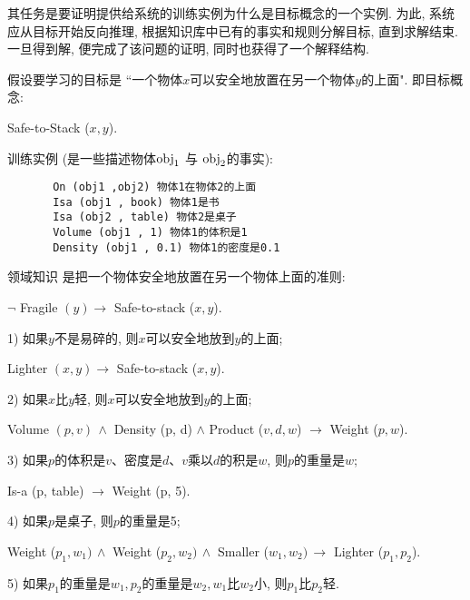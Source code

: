 其任务是要证明提供给系统的训练实例为什么是目标概念的一个实例.
为此, 系统应从目标开始反向推理, 根据知识库中已有的事实和规则分解目标, 直到求解结束.
一旦得到解, 便完成了该问题的证明, 同时也获得了一个解释结构.

\begin{example}\label{AIC7exam7.14}
    假设要学习的目标是 ``一个物体$x$可以安全地放置在另一个物体$y$的上面". 即目标概念:
\begin{center}
    Safe-to-Stack ($x, y$).
\end{center}

训练实例 (是一些描述物体$\textup{obj}_1$ 与 $\textup{obj}_2$的事实):
\begin{Verbatim}
       On (obj1 ,obj2) 物体1在物体2的上面
       Isa (obj1 , book) 物体1是书
       Isa (obj2 , table) 物体2是桌子
       Volume (obj1 , 1) 物体1的体积是1
       Density (obj1 , 0.1) 物体1的密度是0.1
\end{Verbatim}
\vspace{-0.4cm}
\end{example}

领域知识   是把一个物体安全地放置在另一个物体上面的准则:
\begin{center}
    $\neg $ Fragile $(y) \rightarrow$ Safe-to-stack ($x, y$).
\end{center}
1) 如果$y$不是易碎的, 则$x$可以安全地放到$y$的上面;
\begin{center}
    Lighter $(x, y) \rightarrow$ Safe-to-stack ($x, y$).
\end{center}

2) 如果$x$比$y$轻, 则$x$可以安全地放到$y$的上面;
\begin{center}
    Volume $(p, v)\, \wedge$ Density (p, d) $\wedge$ Product ($v, d, w$) $\rightarrow$ Weight ($p, w$).
\end{center}

3) 如果$p$的体积是$v$、密度是$d$、$v$乘以$d$的积是$w$, 则$p$的重量是$w$;
\begin{center}
    Is-a (p, table) $\rightarrow$ Weight (p, 5).
\end{center}

4) 如果$p$是桌子, 则$p$的重量是5;
\begin{center}
    Weight ($p_1, w_1)\, \wedge$ Weight ($p_2,w_2)\, \wedge$ Smaller ($w_1, w_2) \,\rightarrow$ Lighter ($p_1, p_2$).
\end{center}

5) 如果$p_1$的重量是$w_1, p_2$的重量是$w_2,w_1$比$w_2$小,  则$p_1$比$p_2$轻.

